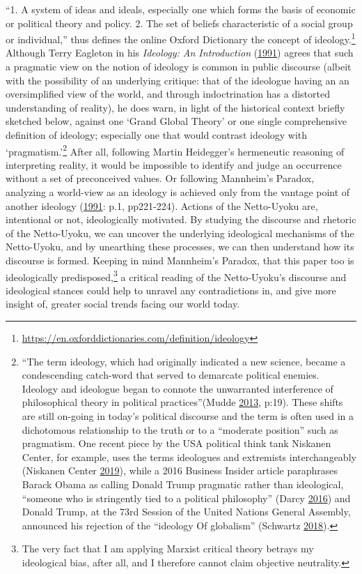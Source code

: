 \documentclass[10pt,british,A4paper,,openany]{memoir}
\begin{document}
``1. A system of ideas and ideals, especially one which forms the basis
of economic or political theory and policy. 2. The set of beliefs
characteristic of a social group or individual,'' thus defines the
online Oxford Dictionary the concept of ideology.\footnote{\url{https://en.oxforddictionaries.com/definition/ideology}}
Although Terry Eagleton in his \emph{Ideology: An Introduction}
(\protect\hyperlink{ref-eagleton_ideology:_1991}{1991}) agrees that such
a pragmatic view on the notion of ideology is common in public discourse
(albeit with the possibility of an underlying critique: that of the
ideologue having an an oversimplified view of the world, and through
indoctrination has a distorted understanding of reality), he does warn,
in light of the historical context briefly sketched below, against one
`Grand Global Theory' or one single comprehensive definition of
ideology; especially one that would contrast ideology with
`pragmatism.'\footnote{``The term ideology, which had originally
  indicated a new science, became a condescending catch-word that served
  to demarcate political enemies. Ideology and ideologue began to
  connote the unwarranted interference of philosophical theory in
  political practices''(Mudde
  \protect\hyperlink{ref-mudde_oxford_2013}{2013}, p:19). These shifts
  are still on-going in today's political discourse and the term is
  often used in a dichotomous relationship to the truth or to a
  ``moderate position'' such as pragmatism. One recent piece by the USA
  political think tank Niskanen Center, for example, uses the terms
  ideologues and extremists interchangeably (Niskanen Center
  \protect\hyperlink{ref-niskanen_center_if_2019}{2019}), while a 2016
  Business Insider article paraphrases Barack Obama as calling Donald
  Trump pragmatic rather than ideological, ``someone who is stringently
  tied to a political philosophy'' (Darcy
  \protect\hyperlink{ref-darcy_obama_2016}{2016}) and Donald Trump, at
  the 73rd Session of the United Nations General Assembly, announced his
  rejection of the ``ideology Of globalism'' (Schwartz
  \protect\hyperlink{ref-schwartz_trump_2018}{2018}).} After all,
following Martin Heidegger's hermeneutic reasoning of interpreting
reality, it would be impossible to identify and judge an occurrence
without a set of preconceived values. Or following Mannheim's Paradox,
analyzing a world-view as an ideology is achieved only from the vantage
point of another ideology
(\protect\hyperlink{ref-eagleton_ideology:_1991}{1991}: p.1, pp221-224).
Actions of the Netto-Uyoku are, intentional or not, ideologically
motivated. By studying the discourse and rhetoric of the Netto-Uyoku, we
can uncover the underlying ideological mechanisms of the Netto-Uyoku,
and by unearthing these processes, we can then understand how its
discourse is formed. Keeping in mind Mannheim's Paradox, that this paper
too is ideologically predisposed,\footnote{The very fact that I am
  applying Marxist critical theory betrays my ideological bias, after
  all, and I therefore cannot claim objective neutrality.} a critical
reading of the Netto-Uyoku's discourse and ideological stances could
help to unravel any contradictions in, and give more insight of, greater
social trends facing our world today.
\end{document}
